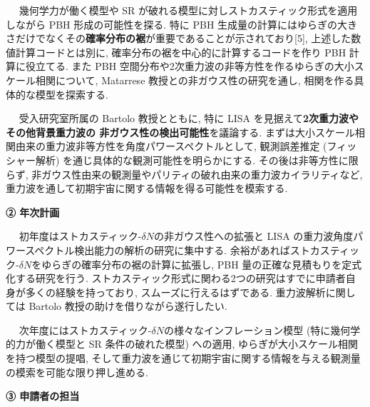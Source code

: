 \documentclass[11pt,a4paper,uplatex,twoside,dvipdfmx]{ujarticle} 	%
\renewcommand{\emph}[1]{{\sffamily\gtfamily\bfseries #1}}
\newcommand{\subject}[1]{\noindent{\sffamily\gtfamily\bfseries #1}~~}
\newcommand{\研究課題名}{\mgfamily ストカスティック形式、原始ブラックホール、重力波観測から迫るインフレーション}
\newcommand{\研究機関名}{\mgfamily 名古屋大学}
\newcommand{\申請者氏名}{\mgfamily 多田 祐一郎}
\newcommand{\研究代表者氏名}{\申請者氏名}
\newcommand{\研究期間の最終元号年度}{34}	%
\begin{document}
{	
	\vspace{3pt}
	\subject{2. PBH}
	幾何学力が働く模型や SR が破れる模型に対しストカスティック形式を適用しながら PBH 形成の可能性を探る.
	特に PBH 生成量の計算にはゆらぎの大きさだけでなくその\emph{確率分布の裾}が重要であることが示されており[5],
	上述した数値計算コードとは別に, 確率分布の裾を中心的に計算するコードを作り PBH 計算に役立てる.
	また PBH 空間分布や2次重力波の非等方性を作るゆらぎの大小スケール相関について,
	Matarrese 教授との非ガウス性の研究を通し, 相関を作る具体的な模型を探索する.
	
	
	\vspace{3pt}
	\subject{3. 重力波}
	受入研究室所属の Bartolo 教授とともに, 特に LISA を見据えて\emph{2次重力波やその他背景重力波の
	非ガウス性の検出可能性}を議論する.
	まずは大小スケール相関由来の重力波非等方性を角度パワースペクトルとして,
	観測誤差推定 (フィッシャー解析) を通じ具体的な観測可能性を明らかにする.
	その後は非等方性に限らず, 非ガウス性由来の観測量やパリティの破れ由来の重力波カイラリティなど,
	重力波を通して初期宇宙に関する情報を得る可能性を模索する.
	
	
	
	
	\begin{mdframed}[roundcorner=0.5zw,
	innertopmargin=0.8zw,innerbottommargin=0.8zw,
	linecolor=black!50,linewidth=0.2zw,
	backgroundcolor=black!10]
	{\bfseries\gtfamily\sffamily\large ② 年次計画}
	\end{mdframed}
	
	\vspace{-10pt}
	\subject{1年目}
	初年度はストカスティック-$\delta N$の非ガウス性への拡張と LISA の重力波角度パワースペクトル検出能力の解析の研究に集中する.
	余裕があればストカスティック-$\delta N$をゆらぎの確率分布の裾の計算に拡張し, PBH 量の正確な見積もりを定式化する研究を行う.
	ストカスティック形式に関わる2つの研究はすでに申請者自身が多くの経験を持っており, スムーズに行えるはずである.
	重力波解析に関しては Bartolo 教授の助けを借りながら遂行したい.
	
	
	\vspace{3pt}
	\subject{2年目}
	次年度にはストカスティック-$\delta N$の様々なインフレーション模型 (特に幾何学的力が働く模型と SR 条件の破れた模型) への適用,
	ゆらぎが大小スケール相関を持つ模型の提唱, そして重力波を通じて初期宇宙に関する情報を与える観測量の模索を可能な限り押し進める.
	
	
	\begin{mdframed}[roundcorner=0.5zw,
	innertopmargin=0.8zw,innerbottommargin=0.8zw,
	linecolor=black!50,linewidth=0.2zw,
	backgroundcolor=black!10]
	{\bfseries\gtfamily\sffamily\large ③ 申請者の担当}
	\end{mdframed}
	
}
\end{document}
